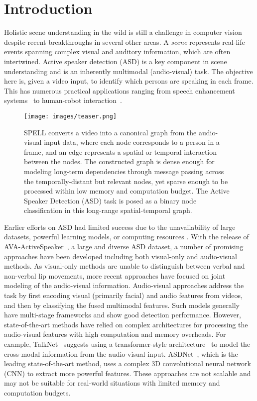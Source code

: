 \documentclass[runningheads]{llncs}
\begin{document}
\section{Introduction}
\label{sec:intro}
Holistic scene understanding in the wild is still a challenge in computer vision despite recent breakthroughs in several other areas. A \emph{scene} represents real-life events spanning complex visual and auditory information, which are often intertwined.
Active speaker detection (ASD) is a key component in scene understanding and is an inherently multimodal (audio-visual) task. The objective here is, given a video input, to identify which persons are speaking in each frame. This has numerous practical applications ranging from speech enhancement systems~\cite{afouras2018conversation} to human-robot interaction~\cite{stefanov2016look,stefanov2017vision}.


\begin{figure}[t!]
\centering
\texttt{[image: images/teaser.png]}
  \caption{SPELL converts a video into a canonical graph from the audio-visual input data, where each node corresponds to a person in a frame, and an edge represents a spatial or temporal interaction between the nodes. The constructed graph is dense enough for modeling long-term dependencies through message passing across the temporally-distant but relevant nodes, yet sparse enough to be processed within low memory and computation budget. 
The Active Speaker Detection (ASD) task is posed as a binary node classification in this long-range spatial-temporal graph.}
  \label{fig:teaser}
\end{figure}
Earlier efforts on ASD had limited success due to the unavailability of large datasets, powerful learning models, or computing resources \cite{cutler2000look,everingham2006hello,everingham2009taking}. With the release of AVA-ActiveSpeaker~\cite{roth2020ava}, a large and diverse ASD dataset, a number of promising approaches have been developed including both visual-only and audio-visual methods.
As visual-only methods \cite{everingham2006hello} are unable to distinguish between verbal and non-verbal lip movements, more recent approaches have focused on joint modeling of the audio-visual information. Audio-visual approaches \cite{alcazarActiveSpeakersContext2020,zhang2021unicon,tao2021someone,MAAS2021,ASDNet_ICCV2021} address the task by first encoding visual (primarily facial) and audio features from videos, and then by classifying the fused multimodal features. Such models generally have multi-stage frameworks \cite{alcazarActiveSpeakersContext2020,MAAS2021,zhang2021unicon,ASDNet_ICCV2021} and show good detection performance. However, state-of-the-art methods have relied on complex architectures
for processing the audio-visual features with high computation and memory overheads. For example, TalkNet~\cite{tao2021someone} suggests using a transformer-style architecture~\cite{vaswani2017attention} to model the cross-modal information from the audio-visual input. ASDNet~\cite{ASDNet_ICCV2021}, which is the leading state-of-the-art method, uses a complex 3D convolutional neural network (CNN) to extract more powerful features. These approaches are not scalable and may not be suitable for real-world situations with limited memory and computation budgets.
\end{document}
